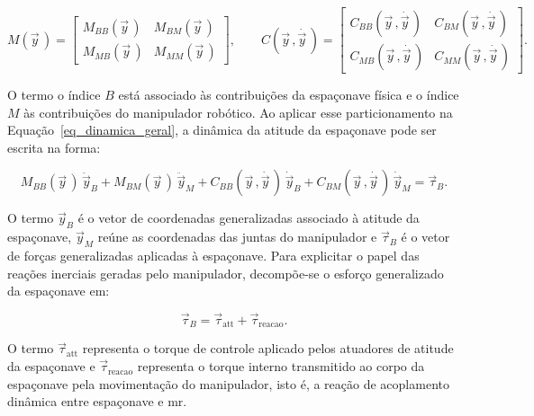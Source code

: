 \begin{equation}
M(\vec y\,) =
\begin{bmatrix}
M_{BB}(\vec y\,) & M_{BM}(\vec y\,) \\
M_{MB}(\vec y\,) & M_{MM}(\vec y\,)
\end{bmatrix},
\qquad
C(\vec y\,,\dot{\vec y\,}) =
\begin{bmatrix}
C_{BB}(\vec y\,,\dot{\vec y\,}) & C_{BM}(\vec y\,,\dot{\vec y\,}) \\
C_{MB}(\vec y\,,\dot{\vec y\,}) & C_{MM}(\vec y\,,\dot{\vec y\,})
\end{bmatrix}.
\label{eq_particionamento_M_C_Lagrange}
\end{equation}

O termo o índice $B$ está associado às contribuições da espaçonave física e o
índice $M$ às contribuições do manipulador robótico.
Ao aplicar esse particionamento na Equação~\eqref{eq_dinamica_geral},
a dinâmica da atitude da espaçonave pode ser escrita na forma:

\begin{equation}
M_{BB}(\vec y\,)\,\ddot{\vec y}_B
+
M_{BM}(\vec y\,)\,\ddot{\vec y}_M
+
C_{BB}(\vec y\,,\dot{\vec y\,})\,\dot{\vec y}_B
+
C_{BM}(\vec y\,,\dot{\vec y\,})\,\dot{\vec y}_M
=
\vec\tau_B.
\label{eq_dinAcoplada_espaconave_compacta}
\end{equation}

O termo $\vec y_B$ é o vetor de coordenadas generalizadas associado à
atitude da espaçonave, $\vec y_M$ reúne as coordenadas das juntas do
manipulador e $\vec\tau_B$ é o vetor de forças generalizadas aplicadas
à espaçonave.
Para explicitar o papel das reações inerciais geradas pelo
manipulador, decompõe-se o esforço generalizado da espaçonave em:

\begin{equation}
\vec\tau_B
=
\vec\tau_{\text{att}}
+
\vec\tau_{\text{reacao}}.
\label{eq_decomposicao_tauB}
\end{equation}


O termo $\vec\tau_{\text{att}}$ representa o torque de controle aplicado
pelos atuadores de atitude da espaçonave e $\vec\tau_{\text{reacao}}$
representa o torque interno transmitido ao corpo da espaçonave pela
movimentação do manipulador, isto é, a reação de acoplamento dinâmica
entre espaçonave e \gls{mr}. 